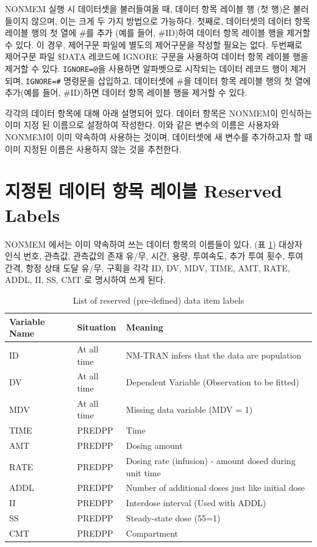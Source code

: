 \documentclass[
  11pt,
  krantz2,
  a4paper]{krantz}
\theoremstyle{definition}
\theoremstyle{definition}
\theoremstyle{definition}
\theoremstyle{remark}
\begin{document}
NONMEM 실행 시 데이터셋을 불러들여올 때, 데이터 항목 레이블 행 (첫 행)은 불러들이지 않으며, 이는 크게 두 가지 방법으로 가능하다. 첫째로, 데이터셋의 데이터 항목 레이블 행의 첫 열에 \#를 추가 (예를 들어, \#ID)하여 데이터 항목 레이블 행을 제거할 수 있다. 이 경우, 제어구문 파일에 별도의 제어구문을 작성할 필요는 없다. 두번째로 제어구문 파일 \$DATA 레코드에 IGNORE 구문을 사용하여 데이터 항목 레이블 행을 제거할 수 있다. \texttt{IGNORE=@}을 사용하면 알파벳으로 시작되는 데이터 레코드 행이 제거되며, \texttt{IGNORE=\#} 명령문을 삽입하고, 데이터셋에 \#을 데이터 항목 레이블 행의 첫 열에 추가(예를 들어, \#ID)하면 데이터 항목 레이블 행을 제거할 수 있다.

각각의 데이터 항목에 대해 아래 설명되어 있다. 데이터 항목은 NONMEM이 인식하는 이미 지정 된 이름으로 설정하여 작성한다. 이와 같은 변수의 이름은 사용자와 NONMEM이 이미 약속하여 사용하는 것이며, 데이터셋에 새 변수를 추가하고자 할 때 이미 지정된 이름은 사용하지 않는 것을 추천한다.

\hypertarget{uxc9c0uxc815uxb41c-uxb370uxc774uxd130-uxd56duxbaa9-uxb808uxc774uxbe14-reserved-labels}{%
\section{지정된 데이터 항목 레이블 Reserved Labels}\label{uxc9c0uxc815uxb41c-uxb370uxc774uxd130-uxd56duxbaa9-uxb808uxc774uxbe14-reserved-labels}}

NONMEM 에서는 이미 약속하여 쓰는 데이터 항목의 이름들이 있다. (표 \ref{tab:reserveditems}) 대상자 인식 번호, 관측값, 관측값의 존재 유/무, 시간, 용량, 투여속도, 추가 투여 횟수, 투여 간격, 항정 상태 도달 유/무, 구획을 각각 ID, DV, MDV, TIME, AMT, RATE, ADDL, II, SS, CMT 로 명시하여 쓰게 된다.

\begin{table}

\caption{\label{tab:reserveditems}List of reserved (pre-defined) data item labels}
\centering
\begin{tabular}[t]{lll}
\toprule
Variable Name & Situation & Meaning\\
\midrule
ID & At all time & NM-TRAN infers that the data are population\\
DV & At all time & Dependent Variable (Observation to be fitted)\\
MDV & At all time & Missing data variable (MDV = 1)\\
TIME & PREDPP & Time\\
AMT & PREDPP & Dosing amount\\
\addlinespace
RATE & PREDPP & Dosing rate (infusion) - amount dosed during unit time\\
ADDL & PREDPP & Number of additional doses just like initial dose\\
II & PREDPP & Interdose interval (Used with ADDL)\\
SS & PREDPP & Steady-state dose (55=1)\\
CMT & PREDPP & Compartment\\
\bottomrule
\end{tabular}
\end{table}
\end{document}
